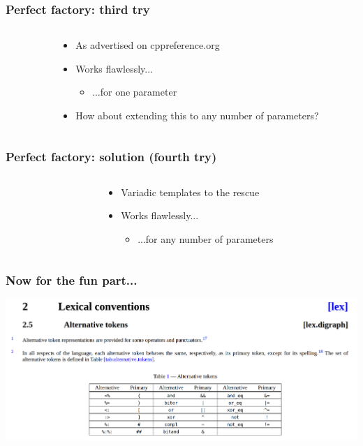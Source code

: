 \documentclass[aspectratio=169]{beamer}
\begin{document}
\begin{frame}[fragile]
\frametitle{Perfect factory: third try}
\begin{columns}
  \begin{column}{0.6\textwidth}
    {\tiny }
  \end{column}
  \begin{column}{0.4\textwidth}
    \begin{itemize}
      \item{As advertised on cppreference.org}
      \item{Works flawlessly...}
      \begin{itemize}
        \item{...for \textcolor{clRedFlag}{one} parameter}
      \end{itemize}
      \item{How about extending this to any number of parameters?}
    \end{itemize}
  \end{column}
\end{columns}
\end{frame}


\begin{frame}[fragile]
\frametitle{Perfect factory: solution (fourth try)}
\begin{columns}
  \begin{column}{0.55\textwidth}
    {\fontsize{3}{4} }
  \end{column}
  \begin{column}{0.45\textwidth}
    \begin{itemize}
      \item{Variadic templates to the rescue}
      \item{Works flawlessly...}
      \begin{itemize}
        \item{...for \textcolor{clGreen}{any} number of parameters}
      \end{itemize}
      \vspace{10em}
    \end{itemize}
  \end{column}
\end{columns}
\end{frame}


\begin{frame}[fragile]
\frametitle{Now for the fun part...}
\includegraphics[width=\textwidth]{pics/lexconv.png}
\end{frame}
\end{document}
